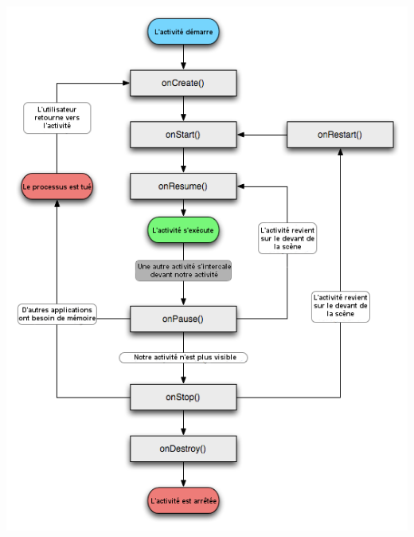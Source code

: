 \documentclass[francais,12pt]{article}
\begin{document}
		\begin{center}
			\includegraphics[width=0.85\linewidth]{images/cycleVie}
		\end{center}
	\newpage
		
\end{document}
